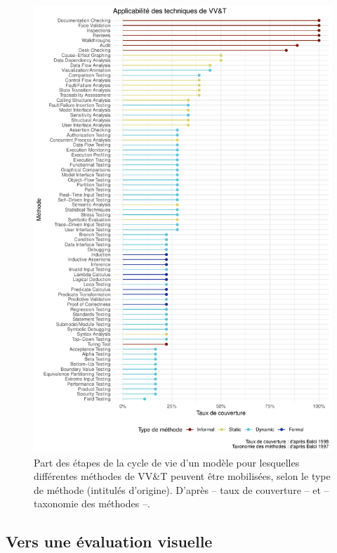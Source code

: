 \begin{figure}[H]
	\includegraphics[width=\linewidth]{img/VVetT_Balci.pdf}
	\caption{Part des étapes de la cycle de vie d'un modèle pour lesquelles différentes méthodes de \og VV\&T\fg{} peuvent être mobilisées, selon le type de méthode (intitulés d'origine).
	D'après \textcite[Table 3, pp. 45-47]{balci1998verification}  -- taux de couverture --  et \textcite[Figure 2, p. 139]{balci_verification_1997}  -- taxonomie des méthodes --.}
	\label{fig:taxonomy_balci}
\end{figure}


\subsection{Vers une évaluation visuelle}

